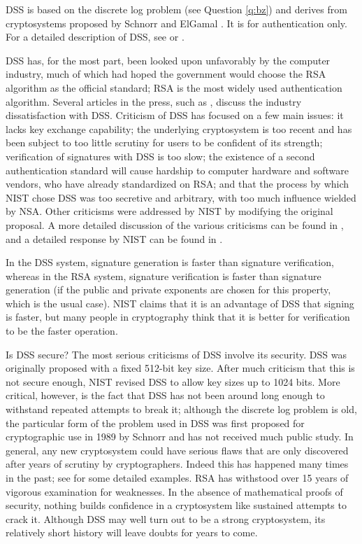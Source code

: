 DSS is based on the discrete log problem (see Question \ref{q:bz}) and
derives from cryptosystems proposed by Schnorr \cite{schnorr} and ElGamal
\cite{elgamal}. It is for authentication only. For a detailed description 
of DSS, see \cite{nist-dss} or \cite{nist-dss-discuss}.

DSS has, for the most part, been looked upon unfavorably by the computer 
industry, much of which had hoped the government would choose the RSA 
algorithm as the official standard; RSA is the most widely used 
authentication algorithm. Several articles in the press, such as 
\cite{messmer}, discuss the industry dissatisfaction with DSS. Criticism 
of DSS has focused on a few main issues: it lacks key exchange capability; 
the underlying cryptosystem is too recent and has been subject to too 
little scrutiny for users to be confident of its strength; verification of 
signatures with DSS is too slow; the existence of a second authentication 
standard will cause hardship to computer hardware and software vendors, who 
have already standardized on RSA; and that the process by which NIST chose 
DSS was too secretive and arbitrary, with too much influence wielded by NSA. 
Other criticisms were addressed by NIST by modifying the original proposal. 
A more detailed discussion of the various criticisms can be found in 
\cite{nist-dss-discuss}, and a detailed response by NIST can be found in 
\cite{smid-branstad-dss}.

In the DSS system, signature generation is faster than signature 
verification, whereas in the RSA system, signature verification is 
faster than signature generation (if the public and private exponents 
are chosen for this property, which is the usual case). NIST claims 
that it is an advantage of DSS that signing is faster, but many people 
in cryptography think that it is better for verification to be the 
faster operation. 

{Is DSS secure?}
The most serious criticisms of DSS involve its security. DSS was originally 
proposed with a fixed 512-bit key size. After much criticism that this is 
not secure enough, NIST revised DSS to allow key sizes up to 1024 bits. More 
critical, however, is the fact that DSS has not been around long enough to 
withstand repeated attempts to break it; although the discrete log problem 
is old, the particular form of the problem used in DSS was first proposed 
for cryptographic use in 1989 by Schnorr \cite{schnorr} and has not received 
much public study. In general, any new cryptosystem could have serious flaws 
that are only discovered after years of scrutiny by cryptographers. Indeed 
this has happened many times in the past; see \cite{brickell-cryptanalysis} 
for some detailed examples. RSA has withstood over 15 years of vigorous 
examination for weaknesses. In the absence of mathematical proofs of security,
nothing builds confidence in a cryptosystem like sustained attempts to crack 
it. Although DSS may well turn out to be a strong cryptosystem, its relatively 
short history will leave doubts for years to come.

